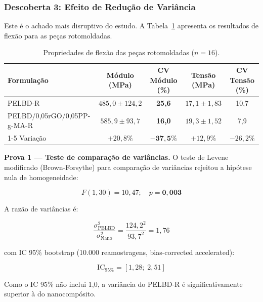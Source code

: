 \documentclass[12pt,a4paper,twoside]{article}
\begin{document}
\subsubsection{Descoberta 3: Efeito de Redução de Variância}

Este é o achado mais disruptivo do estudo. A Tabela~\ref{tab:flexao_rotomoldagem} apresenta os resultados de flexão para as peças rotomoldadas.

\begin{table}[H]
\centering
\caption{Propriedades de flexão das peças rotomoldadas ($n=16$).}
\label{tab:flexao_rotomoldagem}
\begin{tabular}{lcccc}
\toprule
\textbf{Formulação} & \textbf{Módulo (MPa)} & \textbf{CV Módulo (\%)} & \textbf{Tensão (MPa)} & \textbf{CV Tensão (\%)} \\
\midrule
PELBD-R                         & $485,0 \pm 124,2$ & \textbf{25,6} & $17,1 \pm 1,83$ & 10,7 \\
PELBD/0,05rGO/0,05PP-g-MA-R     & $585,9 \pm 93,7$ & \textbf{16,0} & $19,3 \pm 1,52$ & 7,9 \\
\cmidrule{1-5}
Variação                        & $+20,8\%$ & $\mathbf{-37,5\%}$ & $+12,9\%$ & $-26,2\%$ \\
\bottomrule
\end{tabular}
\end{table}

\textbf{Prova 1 — Teste de comparação de variâncias.} O teste de Levene modificado (Brown-Forsythe) para comparação de variâncias rejeitou a hipótese nula de homogeneidade:

\begin{equation}
F(1, 30) = 10,47; \quad p = \mathbf{0,003}
\label{eq:brown_forsythe}
\end{equation}

A razão de variâncias é:

\begin{equation}
\frac{\sigma^2_{\text{PELBD}}}{\sigma^2_{\text{Nano}}} = \frac{124,2^2}{93,7^2} = 1,76
\label{eq:variance_ratio}
\end{equation}

com IC 95\% bootstrap (10.000 reamostragens, bias-corrected accelerated):

\begin{equation}
\text{IC}_{95\%} = [1,28; \; 2,51]
\label{eq:variance_ci}
\end{equation}

Como o IC 95\% não inclui 1,0, a variância do PELBD-R é significativamente superior à do nanocompósito.
\end{document}
